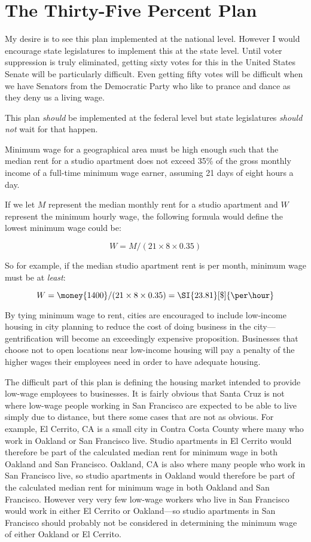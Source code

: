 \section{The Thirty-Five Percent Plan}
\label{thirtyfive}

My desire is to see this plan implemented at the national level. However I would encourage state legislatures to implement this at the state level. Until voter suppression is truly eliminated, getting sixty votes for this in the United States Senate will be particularly difficult. Even getting fifty votes will be difficult when we have Senators from the Democratic Party who like to prance and dance as they deny us a living wage.

This plan \emph{should} be implemented at the federal level but state legislatures \emph{should not} wait for that happen.

Minimum wage for a geographical area must be high enough such that the median rent for a studio apartment does not exceed 35\% of the gross monthly income of a full-time minimum wage earner, assuming 21 days of eight hours a day.

If we let $M$ represent the median monthly rent for a studio apartment and $W$ represent the minimum hourly wage, the following formula would define the lowest minimum wage could be:

\[
W = M / (21 \times 8 \times 0.35)
\]

So for example, if the median studio apartment rent is  per month, minimum wage must be at \emph{least}:

\[
W = \money{1400} / (21 \times 8 \times 0.35) = \SI{23.81}[\$]{\per\hour}
\]

By tying minimum wage to rent, cities are encouraged to include low-income housing in city planning to reduce the cost of doing business in the city---gentrification will become an exceedingly expensive proposition. Businesses that choose not to open locations near low-income housing will pay a penalty of the higher wages their employees need in order to have adequate housing.

The difficult part of this plan is defining the housing market intended to provide low-wage employees to businesses. It is fairly obvious that Santa Cruz is not where low-wage people working in San Francisco are expected to be able to live simply due to distance, but there some cases that are not as obvious. For example, El Cerrito, CA is a small city in Contra Costa County where many who work in Oakland or San Francisco live. Studio apartments in El Cerrito would therefore be part of the calculated median rent for minimum wage in both Oakland and San Francisco. Oakland, CA is also where many people who work in San Francisco live, so studio apartments in Oakland would therefore be part of the calculated median rent for minimum wage in both Oakland and San Francisco. However very very few low-wage workers who live in San Francisco would work in either El Cerrito or Oakland---so studio apartments in San Francisco should probably not be considered in determining the minimum wage of either Oakland or El Cerrito.

